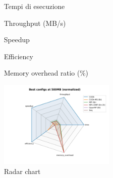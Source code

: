 		\begin{figure}[H]
			\centering
			
			\caption{Tempi di esecuzione}
			\label{fig:summary-times}
		\end{figure}
		
		\begin{figure}[H]
			\centering
			\begin{minipage}[t]{0.49\textwidth}
				\centering
				
				\caption{Throughput (MB/s)}
				\label{fig:summary-throughput}
			\end{minipage}
			\hfill
			\begin{minipage}[t]{0.49\textwidth}
				\centering
				
				\caption{Speedup}
				\label{fig:summary-speedup}
			\end{minipage}
		\end{figure}
		
		\begin{figure}[H]
			\begin{minipage}[t]{0.49\textwidth}
				\centering
				
				\caption{Efficiency}
				\label{fig:summary-efficiency}
			\end{minipage}
			\hfill
			\begin{minipage}[t]{0.49\textwidth}
				\centering
				
				\caption{Memory overhead ratio (\%)}
				\label{fig:summary-memory-overhead}
			\end{minipage}
		\end{figure}
		
		\begin{figure}[H]
			\centering
			\includegraphics[width=0.5\textwidth]{img/overall_plots/overall_radar_500MB.jpg}
			\caption{Radar chart}
			\label{Radar chart}
		\end{figure}